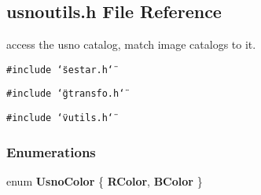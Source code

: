 \subsection{usnoutils.h File Reference}
\label{usnoutils_h}
access the usno catalog, match image catalogs to it. 


{\tt \#include \char`\"{}sestar.h\char`\"{}}\par
{\tt \#include \char`\"{}gtransfo.h\char`\"{}}\par
{\tt \#include \char`\"{}vutils.h\char`\"{}}\par
\subsubsection*{Enumerations}
\begin{CompactItemize}
\item 
enum {\bf Usno\-Color} \{ {\bf RColor}, 
{\bf BColor}
 \}
\end{CompactItemize}
